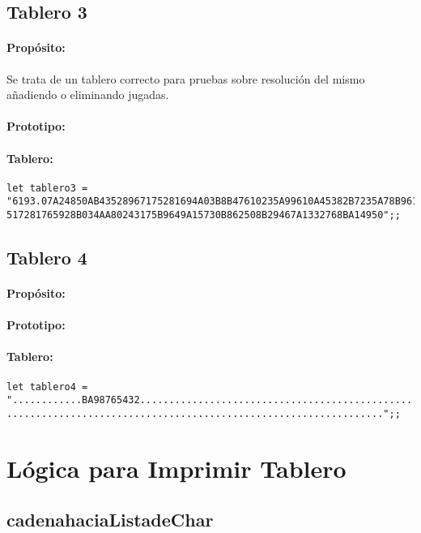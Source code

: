 \subsection{Tablero 3}
\paragraph{Propósito:} Se trata de un tablero correcto para pruebas sobre
resolución del mismo añadiendo o eliminando jugadas.
\paragraph{Prototipo:}
\paragraph{Tablero:}
\begin{verbatim}
let tablero3 =
"6193.07A24850AB43528967175281694A03B8B47610235A99610A45382B7235A78B96104B4390A6
517281765928B034AA80243175B9649A15730B862508B29467A1332768BA14950";;
\end{verbatim}

\subsection{Tablero 4}
\paragraph{Propósito:}
\paragraph{Prototipo:}
\paragraph{Tablero:} 
\begin{verbatim}
let tablero4 =
"............BA98765432.........................................................
.................................................................";;
\end{verbatim}

\section{Lógica para Imprimir Tablero}

\subsection{cadenahaciaListadeChar}

